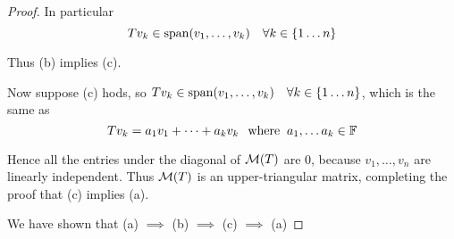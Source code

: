 \begin{proof}
  In particular
  \begin{equation}
    T v_k \in \operatorname{span} (v_1, \ldots, v_k) \quad \forall k \in \{1 \ldots n\}
  \end{equation}
  
  Thus (b) implies (c).
  
  Now suppose (c) hods, so $T v_k \in \operatorname{span} (v_1, \ldots, v_k) \quad \forall k \in \{1 \ldots n\}$, which is the same as
  \begin{equation}
    T v_k = a_1 v_1 + \cdots + a_k v_k \;\;\, \text{where}\;\; a_1, \dots a_k \in \mathbb{F}
  \end{equation}
  
  Hence all the entries under the diagonal of $\mathcal{M} (T)$ are $0$, because $v_1, \ldots, v_n$ are linearly independent. Thus $\mathcal{M}(T)$ is an upper-triangular matrix, completing the proof that (c) implies (a).
  
  We have shown that (a) $\implies$ (b) $\implies$ (c) $\implies$ (a)
\end{proof}

